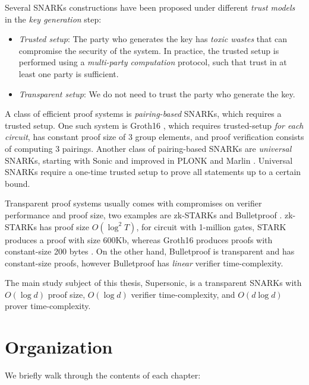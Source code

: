 Several SNARKs constructions have been proposed under different \textit{trust models} in the \textit{key generation} step:
\begin{itemize}
    \item \textit{Trusted setup}: The party who generates the key has \textit{toxic wastes} that can compromise the security of the system. In practice, the trusted setup is performed using a \textit{multi-party computation} protocol, such that trust in at least one party is sufficient.
    \item \textit{Transparent setup}: We do not need to trust the party who generate the key.
\end{itemize}

A class of efficient proof systems is \textit{pairing-based} SNARKs, which requires a trusted setup. One such system is Groth16 \cite{groth2016size}, which requires trusted-setup \textit{for each circuit}, has constant proof size of 3 group elements, and proof verification consists of computing 3 pairings. Another class of pairing-based SNARKs are \textit{universal} SNARKs, starting with Sonic \cite{maller2019sonic} and improved in PLONK \cite{gabizon2019plonk} and Marlin \cite{chiesa2020marlin}. Universal SNARKs require a one-time trusted setup to prove all statements up to a certain bound.

Transparent proof systems usually comes with compromises on verifier performance and proof size, two examples are zk-STARKs \cite{ben2019scalable} and Bulletproof \cite{bunz2018bulletproofs}. zk-STARKs has proof size $O(\log^2 T)$, for circuit with 1-million gates, STARK produces a proof with size 600Kb, whereas Groth16 produces proofs with constant-size 200 bytes \cite{bunz2020transparent}. On the other hand, Bulletproof is transparent and has constant-size proofs, however Bulletproof has \textit{linear} verifier time-complexity.

The main study subject of this thesis, Supersonic, is a transparent SNARKs with $O(\log d)$ proof size, $O(\log d)$ verifier time-complexity, and $O(d \log d)$ prover time-complexity.



\section{Organization}

We briefly walk through the contents of each chapter: 

